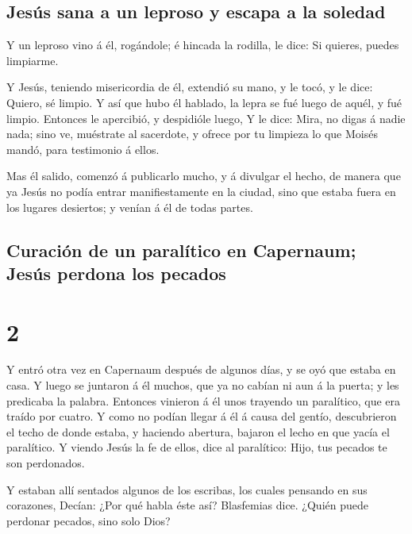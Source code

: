 \hypertarget{jesuxfas-sana-a-un-leproso-y-escapa-a-la-soledad}{%
\subsection{Jesús sana a un leproso y escapa a la
soledad}\label{jesuxfas-sana-a-un-leproso-y-escapa-a-la-soledad}}

 Y un leproso vino á él, rogándole; é hincada la rodilla,
le dice: Si quieres, puedes limpiarme.

 Y Jesús, teniendo misericordia de él, extendió su mano,
y le tocó, y le dice: Quiero, sé limpio.  Y así que hubo
él hablado, la lepra se fué luego de aquél, y fué limpio.
 Entonces le apercibió, y despidióle luego,
 Y le dice: Mira, no digas á nadie nada; sino ve,
muéstrate al sacerdote, y ofrece por tu limpieza lo que Moisés mandó,
para testimonio á ellos.

 Mas él salido, comenzó á publicarlo mucho, y á divulgar
el hecho, de manera que ya Jesús no podía entrar manifiestamente en la
ciudad, sino que estaba fuera en los lugares desiertos; y venían á él de
todas partes.

\hypertarget{curaciuxf3n-de-un-paraluxedtico-en-capernaum-jesuxfas-perdona-los-pecados}{%
\subsection{Curación de un paralítico en Capernaum; Jesús perdona los
pecados}\label{curaciuxf3n-de-un-paraluxedtico-en-capernaum-jesuxfas-perdona-los-pecados}}

\hypertarget{section-1}{%
\section{2}\label{section-1}}

 Y entró otra vez en Capernaum después de algunos días, y
se oyó que estaba en casa.  Y luego se juntaron á él
muchos, que ya no cabían ni aun á la puerta; y les predicaba la palabra.
 Entonces vinieron á él unos trayendo un paralítico, que
era traído por cuatro.  Y como no podían llegar á él á
causa del gentío, descubrieron el techo de donde estaba, y haciendo
abertura, bajaron el lecho en que yacía el paralítico.  Y
viendo Jesús la fe de ellos, dice al paralítico: Hijo, tus pecados te
son perdonados.

 Y estaban allí sentados algunos de los escribas, los
cuales pensando en sus corazones,  Decían: ¿Por qué habla
éste así? Blasfemias dice. ¿Quién puede perdonar pecados, sino solo
Dios?

